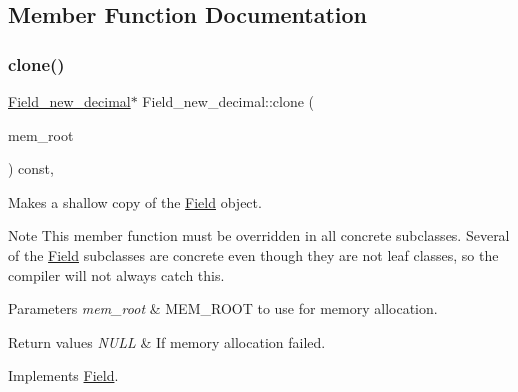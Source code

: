 \subsection{Member Function Documentation}
\mbox{\label{classField__new__decimal_a300e198868ef2e4979f2e7181a3d88e0}} 
\subsubsection{\texorpdfstring{clone()}{clone()}\hspace{0.1cm}{\footnotesize\ttfamily [1/2]}}
{\footnotesize\ttfamily \mbox{\hyperlink{classField__new__decimal}{Field\+\_\+new\+\_\+decimal}}$\ast$ Field\+\_\+new\+\_\+decimal\+::clone (\begin{DoxyParamCaption}\item[{M\+E\+M\+\_\+\+R\+O\+OT $\ast$}]{mem\+\_\+root }\end{DoxyParamCaption}) const\hspace{0.3cm}{\ttfamily [inline]}, {\ttfamily [virtual]}}

Makes a shallow copy of the \mbox{\hyperlink{classField}{Field}} object.

\begin{DoxyNote}{Note}
This member function must be overridden in all concrete subclasses. Several of the \mbox{\hyperlink{classField}{Field}} subclasses are concrete even though they are not leaf classes, so the compiler will not always catch this.
\end{DoxyNote}

\begin{DoxyParams}{Parameters}
{\em mem\+\_\+root} & M\+E\+M\+\_\+\+R\+O\+OT to use for memory allocation. \\
\hline
\end{DoxyParams}

\begin{DoxyRetVals}{Return values}
{\em N\+U\+LL} & If memory allocation failed. \\
\hline
\end{DoxyRetVals}


Implements \mbox{\hyperlink{classField_a64979bcb9345803b031fff76a0c3d9fe}{Field}}.

\mbox{\label{classField__new__decimal_a77df607cdbd9c275b1e55690b4746255}} 
